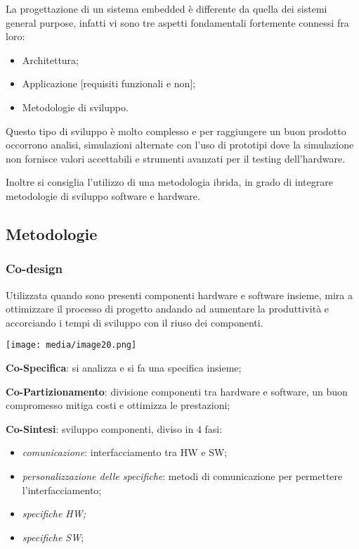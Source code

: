 La progettazione di un sistema embedded è differente da quella dei
sistemi general purpose, infatti vi sono tre aspetti fondamentali
fortemente connessi fra loro:

\begin{itemize}
\item
  Architettura;
\item
  Applicazione {[}requisiti funzionali e non{]};
\item
  Metodologie di sviluppo.
\end{itemize}

Questo tipo di sviluppo è molto complesso e per raggiungere un buon
prodotto occorrono analisi, simulazioni alternate con l'uso di prototipi
dove la simulazione non fornisce valori accettabili e strumenti avanzati
per il testing dell'hardware.

Inoltre si consiglia l'utilizzo di una metodologia ibrida, in grado di
integrare metodologie di sviluppo software e hardware.

\subsection{Metodologie}\label{metodologie}

\subsubsection{Co-design}\label{co-design}

Utilizzata quando sono presenti componenti hardware e software insieme,
mira a ottimizzare il processo di progetto andando ad aumentare la
produttività e accorciando i tempi di sviluppo con il riuso dei
componenti.

\texttt{[image: media/image20.png]}

\textbf{Co-Specifica}: si analizza e si fa una specifica insieme;

\textbf{Co-Partizionamento}: divisione componenti tra hardware e
software, un buon compromesso mitiga costi e ottimizza le prestazioni;

\textbf{Co-Sintesi}: sviluppo componenti, diviso in 4 fasi:

\begin{itemize}
\item
  \emph{comunicazione}: interfacciamento tra HW e SW;
\item
  \emph{personalizzazione delle specifiche}: metodi di comunicazione per
  permettere l'interfacciamento;
\item
  \emph{specifiche HW;}
\item
  \emph{specifiche SW};
\end{itemize}

